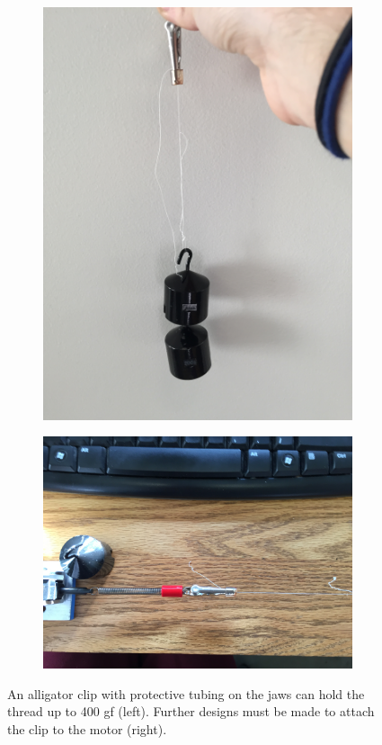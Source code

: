\documentclass[letterpaper,12pt]{article}
\begin{document}
\begin{figure}[h]
\centering
\begin{subfigure}{.5\textwidth}
  \centering
  \includegraphics[width=0.9\linewidth, angle = -90]{thread_hold.jpg}
\end{subfigure}%
\begin{subfigure}{.5\textwidth}
  \centering
  \includegraphics[width=0.9\linewidth]{alligator_motor.jpg}
\end{subfigure}
\caption{An alligator clip with protective tubing on the jaws can hold the thread up to 400 gf (left). Further designs must be made to attach the clip to the motor (right).}
\label{fig:thread}
\end{figure}
\end{document}
